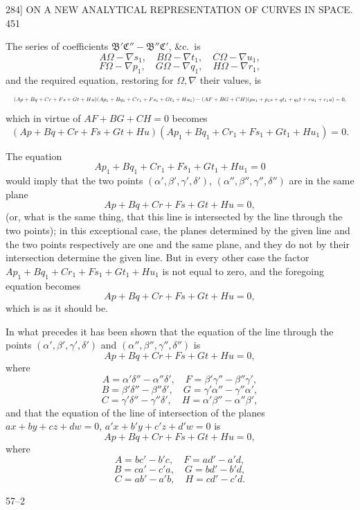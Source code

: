 \documentclass[11pt]{article}
\begin{document}
\begin{center}
\textsc{284]} \hfill ON A NEW ANALYTICAL REPRESENTATION OF CURVES IN SPACE. \hfill 451
\end{center}

The series of coefficients $\mathfrak{B}'\mathfrak{C}''-\mathfrak{B}''\mathfrak{C}'$, \&c.\ is
\[ A\Omega-\nabla s_{1},\quad B\Omega-\nabla t_{1},\quad C\Omega-\nabla u_{1}, \]
\[ F\Omega-\nabla p_{1},\quad G\Omega-\nabla q_{1},\quad H\Omega-\nabla r_{1}, \]
and the required equation, restoring for $\Omega,\nabla$ their values, is
\[ \resizebox{\textwidth}{!}{$\displaystyle
(Ap+Bq+Cr+Fs+Gt+Hu)(Ap_{1}+Bq_{1}+Cr_{1}+Fs_{1}+Gt_{1}+Hu_{1})
-(AF+BG+CH)(ps_{1}+p_{1}s+qt_{1}+q_{1}t+ru_{1}+r_{1}u)=0,
$} \]
which in virtue of $AF+BG+CH=0$ becomes
\[ (Ap+Bq+Cr+Fs+Gt+Hu)(Ap_{1}+Bq_{1}+Cr_{1}+Fs_{1}+Gt_{1}+Hu_{1})=0. \]

The equation
\[ Ap_{1}+Bq_{1}+Cr_{1}+Fs_{1}+Gt_{1}+Hu_{1}=0 \]
would imply that the two points $(\alpha',\beta',\gamma',\delta')$,
$(\alpha'',\beta'',\gamma'',\delta'')$ are in the same plane
\[ Ap+Bq+Cr+Fs+Gt+Hu=0, \]
(or, what is the same thing, that this line is intersected by the line through the
two points); in this exceptional case, the planes determined by the given line and
the two points respectively are one and the same plane, and they do not by their
intersection determine the given line. But in every other case the factor
$Ap_{1}+Bq_{1}+Cr_{1}+Fs_{1}+Gt_{1}+Hu_{1}$ is not equal to zero, and the foregoing
equation becomes
\[ Ap+Bq+Cr+Fs+Gt+Hu=0, \]
which is as it should be.

In what precedes it has been shown that the equation of the line through the
points $(\alpha',\beta',\gamma',\delta')$ and $(\alpha'',\beta'',\gamma'',\delta'')$ is
\[ Ap+Bq+Cr+Fs+Gt+Hu=0, \]
where
\[ A=\alpha'\delta''-\alpha''\delta',\quad F=\beta'\gamma''-\beta''\gamma', \]
\[ B=\beta'\delta''-\beta''\delta',\quad G=\gamma'\alpha''-\gamma''\alpha', \]
\[ C=\gamma'\delta''-\gamma''\delta',\quad H=\alpha'\beta''-\alpha''\beta', \]
and that the equation of the line of intersection of the planes $ax+by+cz+dw=0$,
$a'x+b'y+c'z+d'w=0$ is
\[ Ap+Bq+Cr+Fs+Gt+Hu=0, \]
where
\[ A=bc'-b'c,\quad F=ad'-a'd, \]
\[ B=ca'-c'a,\quad G=bd'-b'd, \]
\[ C=ab'-a'b,\quad H=cd'-c'd. \]

\medskip
\begin{center}57--2\end{center}
\end{document}

